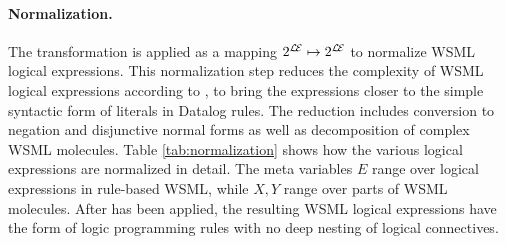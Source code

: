 
\paragraph{Normalization.} The transformation \transnorm is
applied as a mapping $2^{\mathcal{L\!E}} \mapsto 2^{\mathcal{L\!E}}$ to
normalize WSML logical expressions. This normalization step
reduces the complexity of WSML logical expressions according to
\cite[Section 8.2]{wsml-spec}, to bring the expressions closer to
the simple syntactic form of literals in Datalog rules. The
reduction includes conversion to negation and disjunctive normal
forms as well as decomposition of complex WSML molecules. Table
\ref{tab:normalization} shows how the various logical expressions
are normalized in detail. The meta variables $E$ range over
logical expressions in rule-based WSML, while $X,Y$ range over
parts of WSML molecules. After \transnorm has been applied, the
resulting WSML logical expressions have the form of logic
programming rules with no deep nesting of logical connectives.

